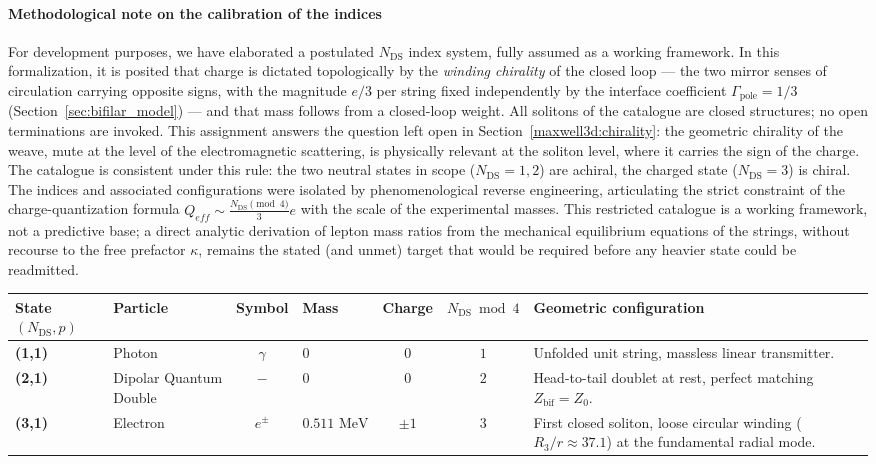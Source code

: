 \documentclass[11pt,a4paper]{article}
\theoremstyle{plain}
\theoremstyle{remark}
\newcommand{\Ncd}{\ensuremath{N_{\mathrm{DS}}}}
\begin{document}
\paragraph{Methodological note on the calibration of the indices}
For development purposes, we have elaborated a postulated $\Ncd$ index system, fully assumed as a working framework. In this formalization, it is posited that charge is dictated topologically by the \emph{winding chirality} of the closed loop --- the two mirror senses of circulation carrying opposite signs, with the magnitude $e/3$ per string fixed independently by the interface coefficient $\Gamma_{\text{pole}} = 1/3$ (Section~\ref{sec:bifilar_model}) --- and that mass follows from a closed-loop weight. All solitons of the catalogue are closed structures; no open terminations are invoked. This assignment answers the question left open in Section~\ref{maxwell3d:chirality}: the geometric chirality of the weave, mute at the level of the electromagnetic scattering, is physically relevant at the soliton level, where it carries the sign of the charge. The catalogue is consistent under this rule: the two neutral states in scope ($\Ncd = 1, 2$) are achiral, the charged state ($\Ncd = 3$) is chiral. The indices and associated configurations were isolated by phenomenological reverse engineering, articulating the strict constraint of the charge-quantization formula $Q_{eff} \sim \frac{\Ncd \pmod 4}{3}e$ with the scale of the experimental masses. This restricted catalogue is a working framework, not a predictive base; a direct analytic derivation of lepton mass ratios from the mechanical equilibrium equations of the strings, without recourse to the free prefactor $\kappa$, remains the stated (and unmet) target that would be required before any heavier state could be readmitted.

{\small
\renewcommand{\arraystretch}{1.2}
\begin{longtable}{p{1.5cm} p{1.9cm} c p{1.6cm} c c >{\raggedright\arraybackslash}p{4.0cm}}
\toprule
\textbf{State $(\Ncd,p)$} & \textbf{Particle} & \textbf{Symbol} & \textbf{Mass} & \textbf{Charge} & \textbf{$\Ncd \bmod 4$} & \textbf{Geometric configuration} \\
\midrule
\endhead
\bottomrule
\endfoot

\textbf{(1,1)} & Photon & $\gamma$ & $0$ & $0$ & $1$ & Unfolded unit string, massless linear transmitter. \\
\textbf{(2,1)} & Dipolar Quantum Double & $-$ & $0$ & $0$ & $2$ & Head-to-tail doublet at rest, perfect matching $Z_{\text{bif}} = Z_0$. \\
\textbf{(3,1)} & Electron & $e^\pm$ & $0.511\text{ MeV}$ & $\pm 1$ & $3$ & First closed soliton, loose circular winding ($R_3/r \approx 37.1$) at the fundamental radial mode. \\
\end{longtable}}
\end{document}
